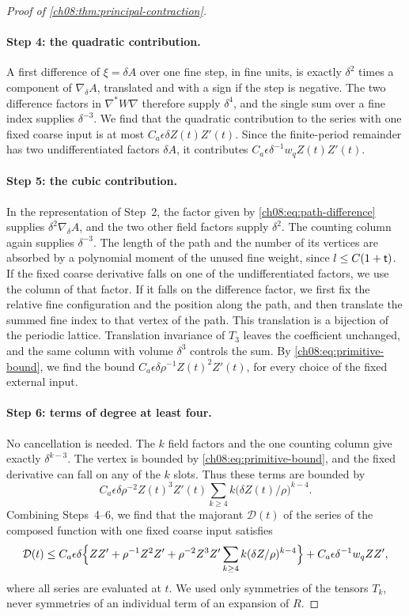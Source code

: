 \begin{proof}[Proof of \cref{ch08:thm:principal-contraction}]
\paragraph{Step 4: the quadratic contribution.}
A first difference of $\xi=\delta A$ over one fine step, in fine units, is exactly $\delta^2$ times a component of $\nabla_\delta A$, translated and with a sign if the step is negative. The two difference factors in $\nabla^*W\nabla$ therefore supply $\delta^4$, and the single sum over a fine index supplies $\delta^{-3}$. We find that the quadratic contribution to the series with one fixed coarse input is at most $C_a\epsilon\delta Z(t)Z'(t)$. Since the finite-period remainder has two undifferentiated factors $\delta A$, it contributes $C_a\epsilon\delta^{-1}w_qZ(t)Z'(t)$.

\paragraph{Step 5: the cubic contribution.}
In the representation of Step~2, the factor given by \eqref{ch08:eq:path-difference} supplies $\delta^2\nabla_\delta A$, and the two other field factors supply $\delta^2$. The counting column again supplies $\delta^{-3}$. The length of the path and the number of its vertices are absorbed by a polynomial moment of the unused fine weight, since $l\le C(1+\mathsf t)$. If the fixed coarse derivative falls on one of the undifferentiated factors, we use the column of that factor. If it falls on the difference factor, we first fix the relative fine configuration and the position along the path, and then translate the summed fine index to that vertex of the path. This translation is a bijection of the periodic lattice. Translation invariance of $T_3$ leaves the coefficient unchanged, and the same column with volume $\delta^3$ controls the sum. By \eqref{ch08:eq:primitive-bound}, we find the bound $C_a\epsilon\delta\rho^{-1}Z(t)^2Z'(t)$, for every choice of the fixed external input.

\paragraph{Step 6: terms of degree at least four.}
No cancellation is needed. The $k$ field factors and the one counting column give exactly $\delta^{k-3}$. The vertex is bounded by \eqref{ch08:eq:primitive-bound}, and the fixed derivative can fall on any of the $k$ slots. Thus these terms are bounded by
\[
 C_a\epsilon\delta\rho^{-2}Z(t)^3Z'(t)
                    \sum_{k\ge4}k\big(\delta Z(t)/\rho\big)^{k-4}.
\]
Combining Steps~4--6, we find that the majorant $\mathcal D(t)$ of the series of the composed function with one fixed coarse input satisfies
\begin{equation}\label{ch08:eq:principal-series}
 \mathcal D(t)\le C_a\epsilon\delta
  \Bigl\{ZZ'+\rho^{-1}Z^2Z'
       +\rho^{-2}Z^3Z'\sum_{k\ge4}k(\delta Z/\rho)^{k-4}\Bigr\}
       +C_a\epsilon\delta^{-1}w_qZZ',
\end{equation}
where all series are evaluated at $t$. We used only symmetries of the tensors $T_k$, never symmetries of an individual term of an expansion of $R$.


\end{proof}
